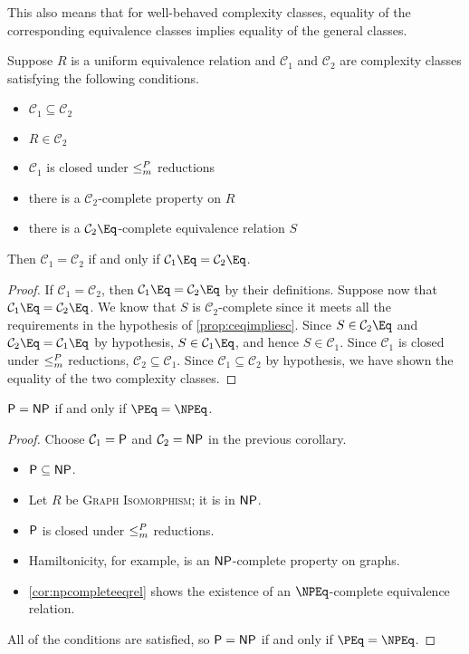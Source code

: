 This also means that for well-behaved complexity classes, equality of the corresponding equivalence classes implies equality of the general classes.

\begin{proposition}
  Suppose $R$ is a uniform equivalence relation and $\mathcal{C}_1$ and $\mathcal{C}_2$ are complexity classes satisfying the following conditions.
  \begin{itemize}
  \item $\mathcal{C}_1 \subseteq \mathcal{C}_2$
  \item $R \in \mathcal{C}_2$
  \item $\mathcal{C}_1$ is closed under $\mor$ reductions
  \item there is a $\mathcal{C}_2$-complete property on $R$
  \item there is a $\mathcal{C}_2\Eq$-complete equivalence relation $S$
  \end{itemize}
  Then $\mathcal{C}_1 = \mathcal{C}_2$ if and only if $\mathcal{C}_1\Eq = \mathcal{C}_2\Eq$.
\end{proposition}
\begin{proof}
  If $\mathcal{C}_1 = \mathcal{C}_2$, then $\mathcal{C}_1\Eq = \mathcal{C}_2\Eq$ by their definitions.
  Suppose now that $\mathcal{C}_1\Eq = \mathcal{C}_2\Eq$.
  We know that $S$ is $\mathcal{C}_2$-complete since it meets all the requirements in the hypothesis of \autoref{prop:ceqimpliesc}.
  Since $S \in \mathcal{C}_2\Eq$ and $\mathcal{C}_2\Eq = \mathcal{C}_1\Eq$ by hypothesis, $S \in \mathcal{C}_1\Eq$, and hence $S \in \mathcal{C}_1$.
  Since $\mathcal{C}_1$ is closed under $\mor$ reductions, $\mathcal{C}_2 \subseteq \mathcal{C}_1$.
  Since $\mathcal{C}_1 \subseteq \mathcal{C}_2$ by hypothesis, we have shown the equality of the two complexity classes.
\end{proof}

\begin{corollary}
  $\P = \NP$ if and only if $\PEq = \NPEq$.
\end{corollary}
\begin{proof}
  Choose $\mathcal{C}_1 = \P$ and $\mathcal{C}_2 = \NP$ in the previous corollary.
  \begin{itemize}
  \item $\P \subseteq \NP$.
  \item Let $R$ be \textsc{Graph Isomorphism}; it is in $\NP$.
  \item $\P$ is closed under $\mor$ reductions.
  \item Hamiltonicity, for example, is an $\NP$-complete property on graphs.
  \item \autoref{cor:npcompleteeqrel} shows the existence of an $\NPEq$-complete equivalence relation.
  \end{itemize}
  All of the conditions are satisfied, so $\P = \NP$ if and only if $\PEq = \NPEq$.
\end{proof}

